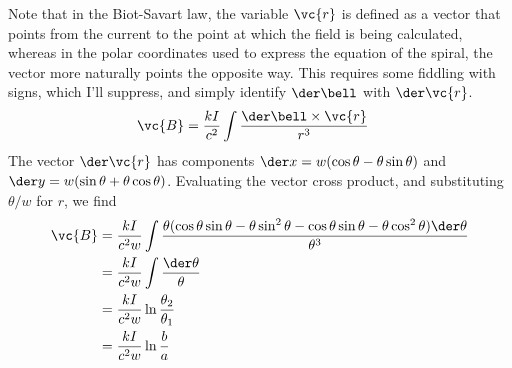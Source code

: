 Note that in the Biot-Savart law, the variable $\vc{r}$ is defined as a vector
that points from the current to the point at which the field is being calculated,
whereas in the polar coordinates used to express the equation of the spiral, the
vector more naturally points the opposite way. This requires some fiddling with
signs, which I'll suppress, and simply identify $\der\bell$ with $\der\vc{r}$.
\begin{align*}
  \vc{B} &= \frac{kI}{c^2}\int \frac{\der\bell\times\vc{r}}{r^3}
\end{align*}
The vector $\der\vc{r}$ has components $\der x=w(\cos\theta-\theta\sin\theta)$ and
$\der y=w(\sin\theta+\theta\cos\theta)$. Evaluating the vector cross product, and
substituting $\theta/w$ for $r$, we find
\begin{align*}
  \vc{B} &= \frac{kI}{c^2w}\int \frac{\theta(\cos\theta\sin\theta-\theta\sin^2\theta-\cos\theta\sin\theta-\theta\cos^2\theta)\der\theta}{\theta^3} \\
         &= \frac{kI}{c^2w}\int \frac{\der\theta}{\theta} \\
         &= \frac{kI}{c^2w}\ln\frac{\theta_2}{\theta_1} \\   
         &= \frac{kI}{c^2w}\ln\frac{b}{a}
\end{align*}

